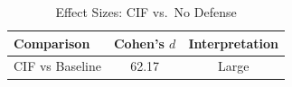 \begin{table}[htbp]
\centering
\caption{Effect Sizes: CIF vs.\ No Defense}
\label{tab:effect-sizes}
\begin{tabular}{lcc}
\toprule
Comparison & Cohen's $d$ & Interpretation \\
\midrule
CIF vs Baseline & 62.17 & Large \\
\bottomrule
\end{tabular}
\end{table}